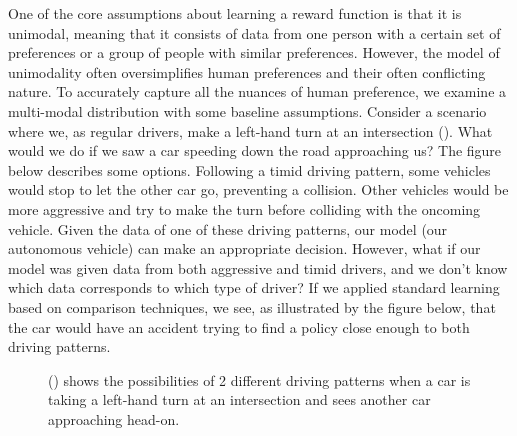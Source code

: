\documentclass[
  letterpaper,
  numbers=noenddot,
  DIV=11,
  oneside]{scrreprt}
\theoremstyle{remark}
\begin{document}
One of the core assumptions about learning a reward function is that it
is unimodal, meaning that it consists of data from one person with a
certain set of preferences or a group of people with similar
preferences. However, the model of unimodality often oversimplifies
human preferences and their often conflicting nature. To accurately
capture all the nuances of human preference, we examine a multi-modal
distribution with some baseline assumptions. Consider a scenario where
we, as regular drivers, make a left-hand turn at an intersection
(). What would we do
if we saw a car speeding down the road approaching us? The figure below
describes some options. Following a timid driving pattern, some vehicles
would stop to let the other car go, preventing a collision. Other
vehicles would be more aggressive and try to make the turn before
colliding with the oncoming vehicle. Given the data of one of these
driving patterns, our model (our autonomous vehicle) can make an
appropriate decision. However, what if our model was given data from
both aggressive and timid drivers, and we don't know which data
corresponds to which type of driver? If we applied standard learning
based on comparison techniques, we see, as illustrated by the figure
below, that the car would have an accident trying to find a policy close
enough to both driving patterns.

\begin{figure}


\caption{\label{fig-driving-patt}() shows the possibilities of 2 different driving patterns
when a car is taking a left-hand turn at an intersection and sees
another car approaching head-on.}

\end{figure}%
\end{document}
